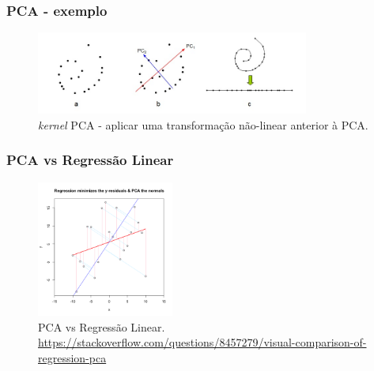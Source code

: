 \begin{frame}%
  \frametitle{PCA - exemplo}
  \begin{figure}[h!]
  \centering
  \includegraphics[width=0.8\textwidth]{images/nonlinear.jpg}
  \caption{\emph{kernel} PCA - aplicar uma transformação não-linear anterior à PCA.}
  \label{fig:nonlinear}
  \end{figure}
\end{frame}


\begin{frame}%
  \frametitle{PCA vs Regressão Linear}
  \begin{figure}[h!]
  \centering
  \includegraphics[width=0.4\textwidth]{images/pcavsfit.png}
  \caption{PCA vs Regressão Linear. \url{https://stackoverflow.com/questions/8457279/visual-comparison-of-regression-pca}}
  \label{fig:pcavsfit}
  \end{figure} 
\end{frame}


